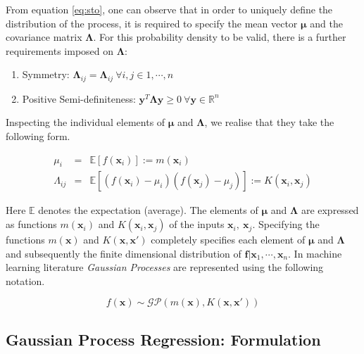 \documentclass[referee,a4paper,12pt,traditabstract]{swsc}
\begin{document}
\begin{linenumbers}
From equation \ref{eq:sto}, one can observe that in order to uniquely define the distribution of the process, it is required to specify the mean vector $\mathbf{\mu}$ and the covariance matrix $\mathbf{\Lambda}$. For this probability density to be valid, there is a further requirements imposed on $\mathbf{\Lambda}$: 

\begin{enumerate}
      \item Symmetry: $\mathbf{\Lambda}_{ij} = \mathbf{\Lambda}_{ij} \ \forall i,j \in {1, \cdots, n} $ 
      \item Positive Semi-definiteness: $\mathbf{y}^T \mathbf{\Lambda} \mathbf{y} \geq 0 \ \forall \mathbf{y} \in \mathbb{R}^n$  
\end{enumerate}

Inspecting the individual elements of $\mathbf{\mu}$ and $\mathbf{\Lambda}$, we realise that they take the following form.

\begin{eqnarray}
      \mu_i & = & \mathbb{E}[f(\mathbf{x}_i)] := m(\mathbf{x}_i) \\
      \Lambda_{ij} & = & \mathbb{E}[(f(\mathbf{x}_i) - \mu_i)(f(\mathbf{x}_j) - \mu_j)] := K(\mathbf{x}_i, \mathbf{x}_j)
\end{eqnarray}

Here $\mathbb{E}$ denotes the expectation (average). The elements of $\mathbf{\mu}$ and $\mathbf{\Lambda}$ are expressed as functions $m(\mathbf{x}_i)$ and $K(\mathbf{x}_i, \mathbf{x}_j)$ of the inputs $\mathbf{x}_i,\ \mathbf{x}_j$. Specifying the functions $m(\mathbf{x})$ and $K(\mathbf{x}, \mathbf{x}')$ completely specifies each element of $\mathbf{\mu}$ and $\mathbf{\Lambda}$ and subsequently the finite dimensional distribution of $\mathbf{f} | \mathbf{x}_1, \cdots, \mathbf{x}_n $. In machine learning literature \emph{Gaussian Processes} are represented using the following notation.

\begin{equation}
    f(\mathbf{x}) \sim \mathcal{GP}(m(\mathbf{x}), K(\mathbf{x}, \mathbf{x}'))
\end{equation}

\subsection{Gaussian Process Regression: Formulation}


\end{linenumbers}
\end{document}
